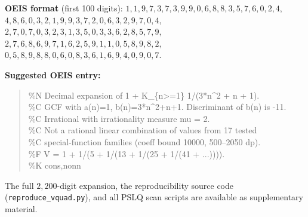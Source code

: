\documentclass[11pt,a4paper]{article}
\theoremstyle{definition}
\theoremstyle{remark}
\begin{document}
\noindent
\textbf{OEIS format} (first 100 digits):
$1, 1, 9, 7, 3, 7, 3, 9, 9, 0, 6, 8, 8, 3, 5, 7, 6, 0, 2, 4,$
$4, 8, 6, 0, 3, 2, 1, 9, 9, 3, 7, 2, 0, 6, 3, 2, 9, 7, 0, 4,$
$2, 7, 0, 7, 0, 3, 2, 3, 1, 3, 5, 0, 3, 3, 6, 2, 8, 5, 7, 9,$
$2, 7, 6, 8, 6, 9, 7, 1, 6, 2, 5, 9, 1, 1, 0, 5, 8, 9, 8, 2,$
$0, 5, 8, 9, 8, 8, 0, 6, 0, 8, 3, 6, 1, 6, 9, 4, 0, 9, 0, 7.$

\noindent
\textbf{Suggested OEIS entry:}
\begin{quote}
\ttfamily\small\noindent
\%N Decimal expansion of 1 + K\_\{n>=1\} 1/(3*n\^{}2 + n + 1).\\
\%C GCF with a(n)=1, b(n)=3*n\^{}2+n+1. Discriminant of b(n) is -11.\\
\%C Irrational with irrationality measure mu = 2.\\
\%C Not a rational linear combination of values from 17 tested\\
\%C special-function families (coeff bound 10000, 500--2050 dp).\\
\%F V = 1 + 1/(5 + 1/(13 + 1/(25 + 1/(41 + ...)))).\\
\%K cons,nonn
\end{quote}

\noindent
The full $2{,}200$-digit expansion, the reproducibility source code
(\texttt{reproduce\_vquad.py}), and all PSLQ scan scripts are
available as supplementary material.
\end{document}
